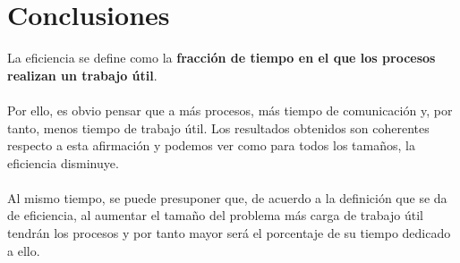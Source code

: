 \section{Conclusiones}

La eficiencia se define como la \textbf{fracción de tiempo en el que los procesos realizan un trabajo útil}. 
\\ \\
Por ello, es obvio pensar que a más procesos, más tiempo de comunicación y, por tanto, menos tiempo de trabajo útil. Los resultados obtenidos son coherentes respecto a esta afirmación y podemos ver como para todos los tamaños, la eficiencia disminuye.
\\ \\
Al mismo tiempo, se puede presuponer que, de acuerdo a la definición que se da de eficiencia, al aumentar el tamaño del problema más carga de trabajo útil tendrán los procesos y por tanto mayor será el porcentaje de su tiempo dedicado a ello.



